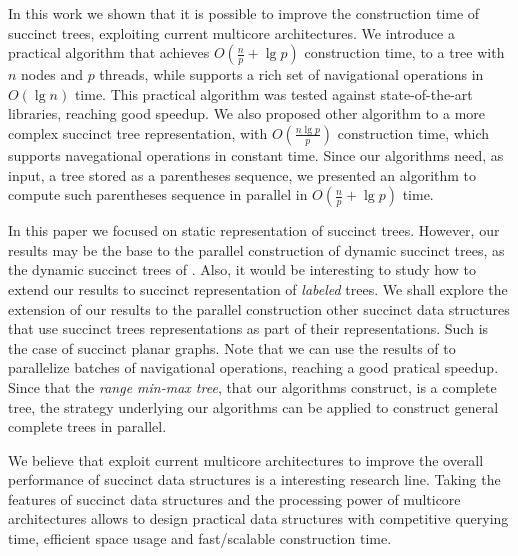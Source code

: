 In this work we shown that it is possible to improve the construction time of succinct
trees, exploiting current multicore architectures. We introduce a practical algorithm that
achieves $O(\frac{n}{p}+\lg p)$ construction time, to a tree with $n$ nodes and $p$
threads, while supports a rich set of navigational operations in $O(\lg n)$ time. This
practical algorithm was tested against state-of-the-art libraries, reaching good speedup.
We also proposed other algorithm to a more complex succinct tree representation, with
$O(\frac{n\lg p}{p})$ construction time, which supports navegational operations in
constant time. Since our algorithms need, as input, a tree stored as a parentheses
sequence, we presented an algorithm to compute such parentheses sequence in parallel in
$O(\frac{n}{p}+\lg p)$ time.

In this paper we focused on static representation of succinct trees. However, our results
may be the base to the parallel construction of dynamic succinct trees, as the dynamic
succinct trees of \cite{Navarro:2014:FFS:2620785.2601073}. Also, it would be interesting
to study how to extend our results to succinct representation of \emph{labeled} trees. We
shall explore the extension of our results to the parallel construction other succinct
data structures that use succinct trees representations as part of their representations.
Such is the case of succinct planar graphs. Note that we can use the results of
\cite{Fuentes2014} to parallelize batches of navigational operations, reaching a good
pratical speedup. Since that the \emph{range min-max tree}, that our algorithms construct,
is a complete tree, the strategy underlying our algorithms can be applied to construct
general complete trees in parallel.

We believe that exploit current multicore architectures to improve the overall performance
of succinct data structures is a interesting research line. Taking the features of
succinct data structures and the processing power of multicore architectures allows to
design practical data structures with competitive querying time, efficient space usage and
fast/scalable construction time.